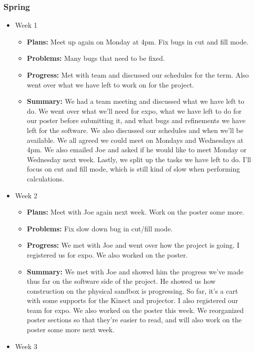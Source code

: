\documentclass[onecolumn, draftclsnofoot,10pt, compsoc]{IEEEtran}
\begin{document}
\subsubsection{Spring}
\begin{itemize}
\item Week 1
	\begin{itemize}
	\item \textbf{Plans:} Meet up again on Monday at 4pm. Fix bugs in cut and fill mode.
    \item \textbf{Problems:} Many bugs that need to be fixed.
    \item \textbf{Progress:} Met with team and discussed our schedules for the term. Also went over what we have left to work on for the project.
	\item \textbf{Summary:} We had a team meeting and discussed what we have left to do. We went over what we'll need for expo, what we have left to do for our poster before submitting it, and what bugs and refinements we have left for the software. We also discussed our schedules and when we'll be available. We all agreed we could meet on Mondays and Wednesdays at 4pm. We also emailed Joe and asked if he would like to meet Monday or Wednesday next week. Lastly, we split up the tasks we have left to do. I'll focus on cut and fill mode, which is still kind of slow when performing calculations.
	\end{itemize}
\item Week 2
	\begin{itemize}
	\item \textbf{Plans:} Meet with Joe again next week. Work on the poster some more.
    \item \textbf{Problems:} Fix slow down bug in cut/fill mode.
    \item \textbf{Progress:} We met with Joe and went over how the project is going. I registered us for expo. We also worked on the poster.
    \item \textbf{Summary:} We met with Joe and showed him the progress we've made thus far on the software side of the project. He showed us how construction on the physical sandbox is progressing. So far, it's a cart with some supports for the Kinect and projector. I also registered our team for expo. We also worked on the poster this week. We reorganized poster sections so that they're easier to read, and will also work on the poster some more next week.
	\end{itemize}
\item Week 3
	\begin{itemize}

\end{itemize}
\end{itemize}
\end{document}
